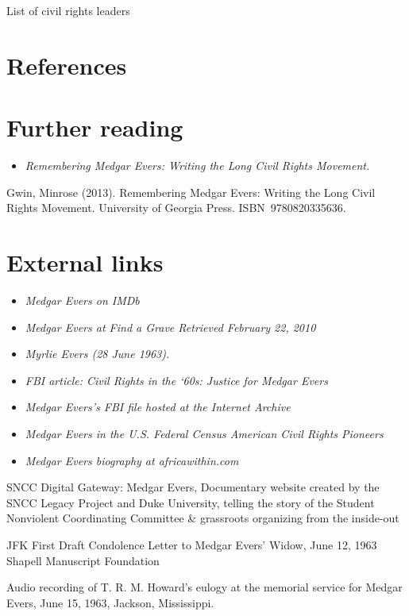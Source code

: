 List of civil rights leaders

\section{References}\label{references}

\section{Further reading}\label{further-reading}

\begin{itemize}
\item
  \emph{Remembering Medgar Evers: Writing the Long Civil Rights
  Movement.}
\end{itemize}

Gwin, Minrose (2013). Remembering Medgar Evers: Writing the Long Civil
Rights Movement. University of Georgia Press. ISBN~9780820335636.

\section{External links}\label{external-links}

\begin{itemize}
\item
  \emph{Medgar Evers on IMDb}
\item
  \emph{Medgar Evers at Find a Grave Retrieved February 22, 2010}
\item
  \emph{Myrlie Evers (28 June 1963).}
\item
  \emph{FBI article: Civil Rights in the `60s: Justice for Medgar Evers}
\item
  \emph{Medgar Evers's FBI file hosted at the Internet Archive}
\item
  \emph{Medgar Evers in the U.S. Federal Census American Civil Rights
  Pioneers}
\item
  \emph{Medgar Evers biography at africawithin.com}
\end{itemize}

SNCC Digital Gateway: Medgar Evers, Documentary website created by the
SNCC Legacy Project and Duke University, telling the story of the
Student Nonviolent Coordinating Committee \& grassroots organizing from
the inside-out

JFK First Draft Condolence Letter to Medgar Evers' Widow, June 12, 1963
Shapell Manuscript Foundation

Audio recording of T. R. M. Howard's eulogy at the memorial service for
Medgar Evers, June 15, 1963, Jackson, Mississippi.

